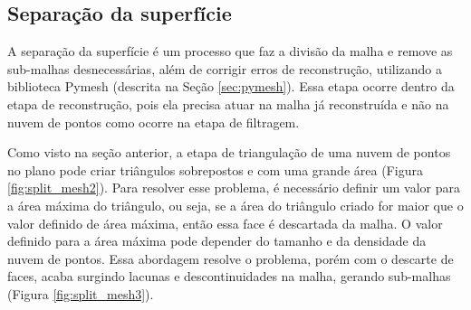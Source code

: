 \subsection{Separação da superfície}
\label{sec:split_mesh}

A separação da superfície é um processo que faz a divisão da malha e remove as sub-malhas desnecessárias, além de corrigir erros de reconstrução, utilizando a biblioteca Pymesh (descrita na Seção \ref{sec:pymesh}).
Essa etapa ocorre dentro da etapa de reconstrução, pois ela precisa atuar na malha já reconstruída e não na nuvem de pontos como ocorre na etapa de filtragem.

Como visto na seção anterior, a etapa de triangulação de uma nuvem de pontos no plano pode criar triângulos sobrepostos e com uma grande área (Figura \ref{fig:split_mesh2}).
Para resolver esse problema, é necessário definir um valor para a  área máxima do triângulo, ou seja, se a área do triângulo criado for maior que o valor definido de área máxima, então essa face é descartada da malha.
O valor definido para a área máxima pode depender do tamanho e da densidade da nuvem de pontos.
Essa abordagem resolve o problema, porém com o descarte de faces, acaba surgindo lacunas e descontinuidades na malha, gerando sub-malhas (Figura \ref{fig:split_mesh3}).

